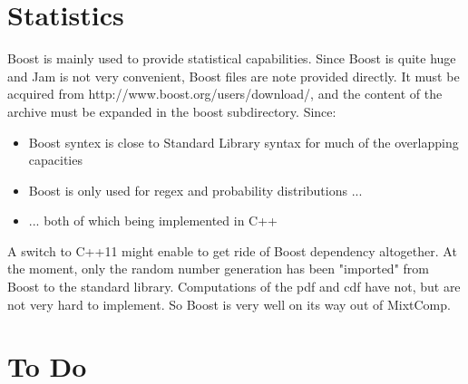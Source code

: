 \documentclass{article}
\begin{document}
\section{Statistics}

Boost is mainly used to provide statistical capabilities. Since Boost is quite huge and Jam is not very convenient, Boost files are note provided directly. It must be acquired from http://www.boost.org/users/download/, and the content of the archive must be expanded in the boost subdirectory. Since:

\begin{itemize}
\item Boost syntex is close to Standard Library syntax for much of the overlapping capacities
\item Boost is only used for regex and probability distributions ...
\item ... both of which being implemented in C++
\end{itemize}

A switch to C++11 might enable to get ride of Boost dependency altogether. At the moment, only the random number generation has been "imported" from Boost to the standard library. Computations of the pdf and cdf have not, but are not very hard to implement. So Boost is very well on its way out of MixtComp.

\section{To Do}
\end{document}
